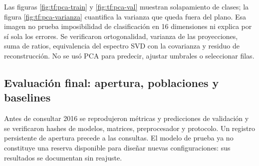 Las figuras \ref{fig:tf:pca-train} y \ref{fig:tf:pca-val} muestran solapamiento de clases; la figura \ref{fig:tf:pca-varianza} cuantifica la varianza que queda fuera del plano. Esa imagen no prueba imposibilidad de clasificación en 16 dimensiones ni explica por sí sola los errores. Se verificaron ortogonalidad, varianza de las proyecciones, suma de ratios, equivalencia del espectro SVD con la covarianza y residuo de reconstrucción. No se usó PCA para predecir, ajustar umbrales o seleccionar filas.

\clearpage
\subsection{Evaluación final: apertura, poblaciones y baselines}
Antes de consultar 2016 se reprodujeron métricas y predicciones de validación y se verificaron hashes de modelos, matrices, preprocesador y protocolo. Un registro persistente de apertura precede a las consultas. El modelo de prueba ya no constituye una reserva disponible para diseñar nuevas configuraciones: sus resultados se documentan sin reajuste.

